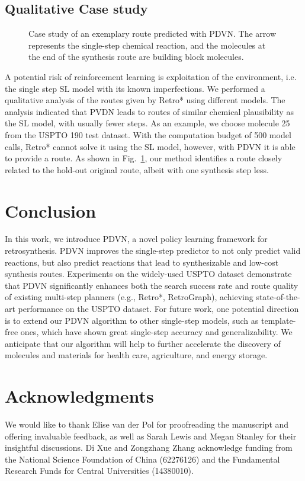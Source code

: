 \documentclass[nohyperref]{article}
\theoremstyle{plain}
\theoremstyle{definition}
\theoremstyle{remark}
\begin{document}
\subsection{Qualitative Case study}

\begin{figure}[t]
\caption{
{
Case study of an exemplary route predicted with PDVN. The arrow represents the single-step chemical reaction,
and the molecules at the end of the synthesis route are building block molecules.
}
}
\label{fig:case_study}
\end{figure}

A potential risk of reinforcement learning is exploitation of the environment, i.e. the single step SL model with its known imperfections. We performed a qualitative analysis of the routes given by Retro* using different models. The analysis indicated that PVDN leads to routes of similar chemical plausibility as the SL model, with usually fewer steps. 
As an example, we choose molecule 25 from the USPTO 190 test dataset. With the computation budget of 500 model calls, Retro* cannot solve it using the SL model, however, with PDVN it is able to provide a route. 
As shown in Fig.~\ref{fig:case_study}, our method identifies a route closely related to the hold-out original route, albeit with one synthesis step less. 

\section{Conclusion}

In this work, we introduce PDVN, a novel policy learning framework for retrosynthesis. 
PDVN improves the single-step predictor to not only predict valid reactions, but also predict reactions that lead to synthesizable and low-cost synthesis routes.
Experiments on the widely-used USPTO dataset demonstrate that PDVN significantly enhances both the search success rate and route quality of existing multi-step planners (e.g., Retro*, RetroGraph), achieving state-of-the-art performance on the USPTO dataset.  
For future work, one potential direction is to extend our PDVN algorithm to other single-step models, such as template-free ones, which have shown great single-step accuracy and generalizability.
We anticipate that our algorithm will help to further accelerate the discovery of molecules and materials for health care, agriculture, and energy storage.

\section{Acknowledgments}
We would like to thank Elise van der Pol for proofreading the manuscript and offering invaluable feedback, as well as Sarah Lewis and Megan Stanley for their insightful discussions. 
Di Xue and Zongzhang Zhang acknowledge funding from the National Science Foundation of China (62276126) and the Fundamental Research Funds for Central Universities (14380010).
\end{document}

